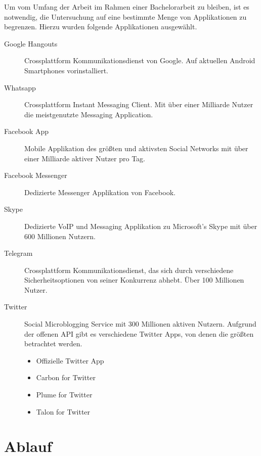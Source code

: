 Um vom Umfang der Arbeit im Rahmen einer Bachelorarbeit zu bleiben, ist es notwendig, die Untersuchung auf eine bestimmte Menge von Applikationen zu begrenzen.
Hierzu wurden folgende Applikationen ausgewählt.
\begin{description}
  \item [Google Hangouts] Crossplattform Kommunikationsdienst von Google. Auf aktuellen Android Smartphones vorinstalliert.
  \item [Whatsapp] Crossplattform Instant Messaging Client. Mit über einer Milliarde Nutzer die meistgenutzte Messaging Application\cite{whatsappuser}.
  \item [Facebook App] Mobile Applikation des größten und aktivsten Social Networks mit über einer Milliarde aktiver Nutzer pro Tag\cite{facebookuser}.
  \item [Facebook Messenger] Dedizierte Messenger Applikation von Facebook.
  \item [Skype] Dedizierte VoIP und Messaging Applikation zu Microsoft's Skype mit über 600 Millionen Nutzern\cite{skypeuser}.
  \item [Telegram] Crossplattform Kommunikationsdienst, das sich durch verschiedene Sicherheitsoptionen von seiner Konkurrenz abhebt. Über 100 Millionen Nutzer\cite{telegramuser}.
  \item [Twitter] Social Microblogging Service mit 300 Millionen aktiven Nutzern. Aufgrund der offenen API gibt es verschiedene Twitter Apps, von denen die größten betrachtet werden.
  \begin{itemize}
      \item Offizielle Twitter App
      \item Carbon for Twitter
      \item Plume for Twitter
      \item Talon for Twitter
  \end{itemize}
\end{description}



\section{Ablauf}
\label{ch:Entwurf:sec:Abschnitt2}

